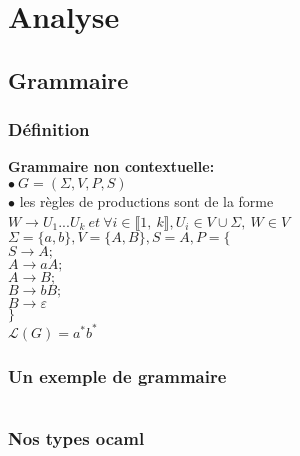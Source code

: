 \section{Analyse}

\subsection{Grammaire}
\begin{frame}
    \frametitle{Définition \esp}

    \textbf{Grammaire non contextuelle:}\\
    $\bullet \ G=(\Sigma, V, P, S)$\\
    $\bullet$ les règles de productions sont de la forme $W \rightarrow U_1...U_k\ et\ \forall i \in \llbracket1,\ k\rrbracket, U_i \in V \cup \Sigma , \ W \in V $
    \vspace{0.5cm}
    $ $\\
    {
        $\Sigma = \{a,b\}, V = \{A,B\}, S = A, P = \{$\\
        $ S \rightarrow A ;$\\
        $ A \rightarrow aA ;$\\
        $ A \rightarrow B ;$\\
        $ B \rightarrow bB ;$\\
        $ B \rightarrow \varepsilon$\\
        $\}$\\
        $\mathcal{L} (G) = a^*b^*$
    }
\end{frame}

\begin{frame}
    \frametitle{Un exemple de grammaire\esp}
    \inputminted[breaklines, fontsize=\smaller]{text}{static/Grammaire_exemple.txt}
\end{frame}

\begin{frame}
    \frametitle{Nos types ocaml\esp}
    \noindent
    \begin{minipage}[t]{0.48\textwidth}
    \end{minipage}
        \hfill
    \begin{minipage}[t]{0.48\textwidth}
    \end{minipage}

\end{frame}



